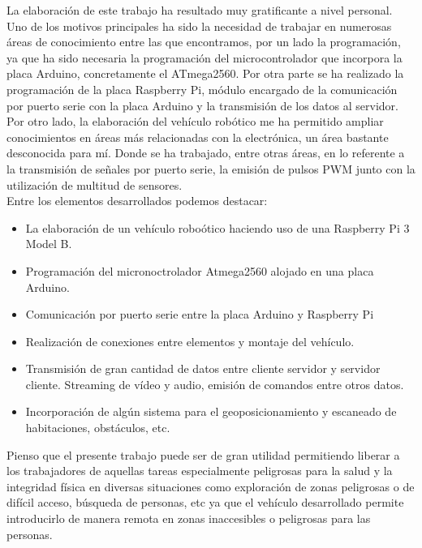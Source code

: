 La elaboración de este trabajo ha resultado muy gratificante a nivel personal. Uno de los motivos principales ha sido la necesidad de trabajar en numerosas áreas de 
conocimiento entre las que encontramos, por un lado la programación, ya que ha sido necesaria la programación del microcontrolador que incorpora la placa Arduino, 
concretamente el ATmega2560. Por otra parte se ha realizado la programación de la placa Raspberry Pi, módulo encargado de la comunicación por puerto serie con la placa Arduino y la 
transmisión de los datos al servidor.\\

Por otro lado, la elaboración del vehículo robótico me ha permitido ampliar conocimientos en áreas más relacionadas con la electrónica, un área bastante desconocida para mí. 
Donde se ha trabajado, entre otras áreas, en lo referente a la transmisión de señales por puerto serie, la emisión de pulsos PWM junto con la utilización de multitud de sensores.\\

Entre los elementos desarrollados podemos destacar:\\

\begin{itemize}
 \item La elaboración de un vehículo roboótico haciendo uso de una Raspberry Pi 3 Model B.
 \item Programación del micronoctrolador Atmega2560 alojado en una placa Arduino.
 \item Comunicación por puerto serie entre la placa Arduino y Raspberry Pi
 \item Realización de conexiones entre elementos y montaje del vehículo.
 \item Transmisión de gran cantidad de datos entre cliente servidor y servidor cliente. Streaming de vídeo y audio, emisión de comandos entre otros datos.\\
 \item Incorporación de algún sistema para el geoposicionamiento y escaneado de habitaciones, obstáculos, etc.
\end{itemize}

Pienso que el presente trabajo puede ser de gran utilidad permitiendo liberar a los trabajadores de aquellas tareas especialmente peligrosas para la salud y la integridad física en diversas situaciones 
como exploración de zonas peligrosas o de difícil acceso, búsqueda de personas, etc ya que el vehículo desarrollado permite introducirlo de manera remota en zonas inaccesibles 
o peligrosas para las personas.\\

